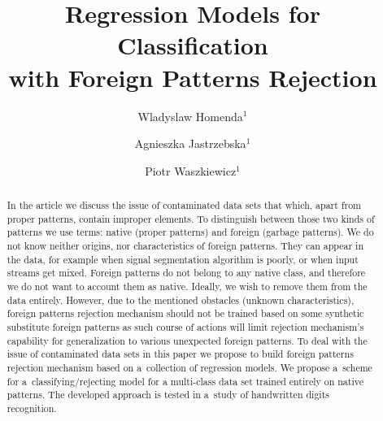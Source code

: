 \documentclass{llncs}
\begin{document}
\title{Regression Models for Classification \\with Foreign Patterns Rejection}
\author{Wladyslaw Homenda$^{1}$
\and Agnieszka Jastrzebska$^1$
\and Piotr Waszkiewicz$^{1}$
}


\maketitle

\pagestyle{empty}  %

\begin{abstract}
In the article we discuss the issue of contaminated data sets that which, apart from proper patterns, contain improper elements. To distinguish between those two kinds of patterns we use terms: native (proper patterns) and foreign (garbage patterns). We do not know neither origins, nor characteristics of foreign patterns. They can appear in the data, for example when signal segmentation algorithm is poorly, or when input streams get mixed. Foreign patterns do not belong to any native class, and therefore we do not want to account them as native. Ideally, we wish to remove them from the data entirely. However, due to the mentioned obstacles (unknown characteristics), foreign patterns rejection mechanism  should not be trained based on some synthetic substitute foreign patterns as such course of actions will limit rejection mechanism's capability for generalization to various unexpected foreign patterns. To deal with the issue of contaminated data sets in this paper we propose to build foreign patterns rejection mechanism based on a~collection of regression models. We propose a~scheme for a~classifying/rejecting model for a multi-class data set trained entirely on native patterns. The developed approach is tested in a~study of handwritten digits recognition. 
\end{abstract}
\end{document}

